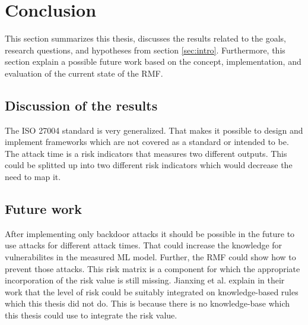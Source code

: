 \section{Conclusion}
\label{sec:conclusion}

This section summarizes this thesis, discusses the results related to the goals, research questions, and hypotheses from section \ref{sec:intro}. Furthermore, this section explain a possible future work based on the concept, implementation, and evaluation of the current state of the RMF.

\subsection{Discussion of the results}

The ISO 27004 standard is very generalized. That makes it possible to design and implement frameworks which are not covered as a standard or intended to be. The attack time is a risk indicators that measures two different outputs. This could be splitted up into two different risk indicators which would decrease the need to map it.

\subsection{Future work}

After implementing only backdoor attacks it should be possible in the future to use attacks for different attack times. That could increase the knowledge for vulnerabilites in the measured ML model. Further, the RMF could show how to prevent those attacks. This risk matrix is a component for which the appropriate incorporation of the risk value is still missing. Jianxing et al. \cite{DBLP:journals/access/JianxingHSH21} explain in their work that the level of risk could be suitably integrated on knowledge-based rules which this thesis did not do. This is because there is no knowledge-base which this thesis could use to integrate the risk value.
